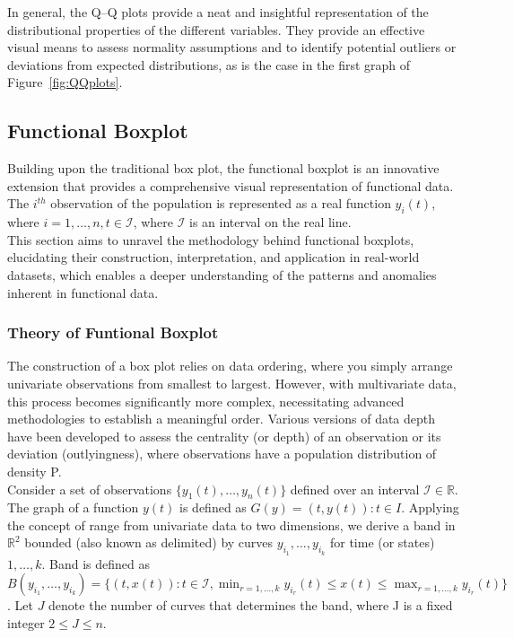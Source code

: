 \documentclass{article}\usepackage[]{graphicx}\usepackage[]{xcolor}
\numberwithin{equation}{section}
\begin{document}
\noindent In general, the Q–Q plots provide a neat and insightful representation of the distributional properties of the different variables. They provide an effective visual means to assess normality assumptions and to identify potential outliers or deviations from expected distributions, as is the case in the first graph of Figure~\ref{fig:QQplots}. 

\subsection{Functional Boxplot}

\noindent
Building upon the traditional box plot, the functional boxplot is an innovative extension that provides a comprehensive visual representation of functional data. The $i^{th}$ observation of the population is represented as a real function $y_i(t)$, where $i = 1, \dots , n, t \in \mathcal{I}$, where $\mathcal{I}$ is an interval on the real line.\\

\noindent
This section aims to unravel the methodology behind functional boxplots, elucidating their construction, interpretation, and application in real-world datasets, which enables a deeper understanding of the patterns and anomalies inherent in functional data.

\subsubsection{Theory of Funtional Boxplot}

The construction of a box plot relies on data ordering, where you simply arrange univariate observations from smallest to largest. However, with multivariate data, this process becomes significantly more complex, necessitating advanced methodologies to establish a meaningful order. Various versions of data depth have been developed to assess the centrality (or depth) of an observation or its deviation (outlyingness), where observations have a population distribution of density P.\\

\noindent
Consider a set of observations $\{y_1(t),\dots,y_n(t)\}$ defined over an interval $\mathcal{I} \in \mathbb{R}$. The graph of a function $y(t)$ is defined as $G(y) = {(t,y(t)) : t \in I}$. Applying the concept of range from univariate data to two dimensions, we derive a band in $\mathbb{R}^2$ bounded (also known as delimited) by curves $y_{i_1},\dots, y_{i_k}$ for time (or states) $1, \dots, k$. Band is defined as $B(y_{i_1},\dots,y_{i_k}) = \{(t,x(t)): t \in \mathcal{I}, \min_{r=1,\dots,k} y_{i_r}(t) \leq x(t) \leq \max_{r=1,\dots,k} y_{i_r}(t)\}$. Let $J$ denote the number of curves that determines the band, where J is a fixed integer $2 \le J \le n$.\\
\end{document}
